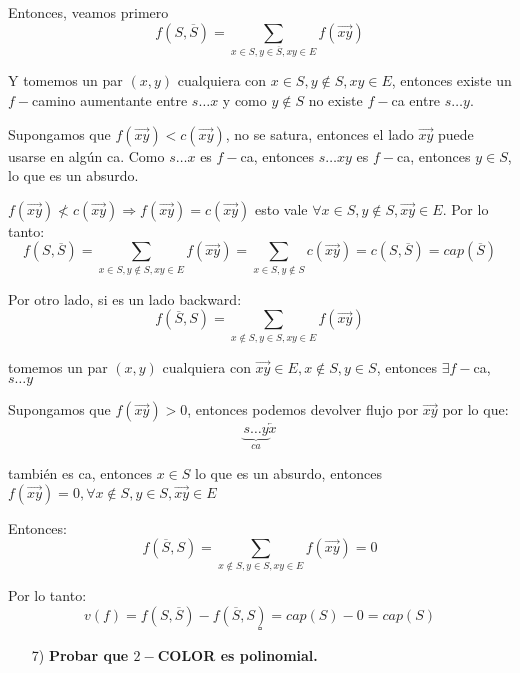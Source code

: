 \documentclass[12pt,a4paper]{article}
\begin{document}
Entonces, veamos primero
$$f(S,\overline{S}) = \sum_{x\in S, y\in \overline{S}, xy \in E} f(\overrightarrow{xy})$$

Y tomemos un par $(x,y)$ cualquiera con $x\in S, y \notin S, xy \in E$, entonces 
existe un $f-$camino aumentante entre $s\ldots x$ y como $y \notin S$ no existe 
$f-$ca entre $s\ldots y$.
\medskip

Supongamos que $f(\overrightarrow{xy}) < c(\overrightarrow{xy})$, no se satura, 
entonces el lado $\overrightarrow{xy}$ puede usarse en algún ca. Como $s\ldots x$ 
es $f-$ca, entonces $s\ldots xy$ es $f-$ca, entonces $y \in S$, lo que es un absurdo.
\medskip

$f(\overrightarrow{xy}) \nless c(\overrightarrow{xy}) \Rightarrow f(\overrightarrow{xy}) = c(\overrightarrow{xy})$ 
esto vale $\forall x\in S, y\notin S, \overrightarrow{xy}\in E$. Por lo tanto:
$$f(S,\overline{S}) = \sum_{x\in S, y\notin S, xy \in E} f(\overrightarrow{xy}) = \sum_{x\in S, y\notin S}c(\overrightarrow{xy}) = c(S,\overline{S}) = cap(\overline{S})$$

Por otro lado, si es un lado backward:
$$f(\overline{S},S) = \sum_{x\notin S, y\in S, xy \in E} f(\overrightarrow{xy})$$

tomemos un par $(x,y)$ cualquiera con $\overrightarrow{xy} \in E, x\notin S, y\in S$, 
entonces $\exists f-$ca, $s\ldots y$
\medskip

Supongamos que $f(\overrightarrow{xy}) > 0$, entonces podemos devolver flujo por 
$\overrightarrow{xy}$ por lo que:
$$\underbrace{s\ldots y}_{ca}\overleftarrow{x}$$ 

también es ca, entonces $x\in S$ lo que es un absurdo, entonces $f(\overrightarrow{xy}) = 0, \forall x\notin S, y\in S, \overrightarrow{xy}\in E$
\medskip

Entonces:
$$f(\overline{S},S) = \sum_{x\notin S, y\in S, xy\in E} f(\overrightarrow{xy}) = 0$$

Por lo tanto:
$$v(f) = f(S,\overline{S}) - f(\overline{S},S) = cap(S) - 0 = cap(S)$$
$$\square$$

\begin{itemize}
    \item [7)] \textbf{Probar que $2-$COLOR es polinomial.}
    \label{dem:2color}
\end{itemize}
\end{document}
